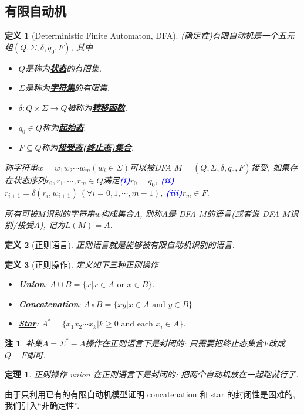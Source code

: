 \documentclass[8pt]{article}
\theoremstyle{compact}
\newtheorem{theorem}{定理}[section]
\newtheorem{definition}{定义}[section]
\newtheorem{remark}{注}[section]
\def\obj#1{\textbf{\uline{#1}}}
\def\num#1{\textnormal{\textbf{\mbox{\textcolor{blue}{(#1)}}}}}
\def\ge{\geqslant}
\begin{document}
\subsection{有限自动机}
\begin{definition}[Deterministic Finite Automaton, DFA]
	(确定性)有限自动机是一个五元组$(Q, \Sigma, \delta, q_0, F)$, 其中
	\begin{itemize}
		\item $Q$是称为\obj{状态}的有限集. 
		\item $\Sigma$是称为\obj{字符集}的有限集. 
		\item $\delta: Q \times \Sigma \to Q$被称为\obj{转移函数}. 
		\item $q_0 \in Q$称为\obj{起始态}. 
		\item $F \subseteq Q$称为\obj{接受态(终止态)集合}. 
	\end{itemize}

	称字符串$w = w_1w_2\cdots w_m(w_i \in \Sigma)$可以被DFA $M = (Q, \Sigma, \delta, q_0, F)$接受, 如果存在状态序列$r_0, r_1, \cdots, r_m \in Q$满足\num{i}$r_0 = q_0$, \num{ii}$r_{i+1} = \delta(r_i, w_{i+1}) \ (\forall i = 0, 1, \cdots, m-1)$, \num{iii}$r_m \in F$. 

	所有可被$M$识别的字符串$w$构成集合$A$, 则称$A$是 DFA $M$的语言(或者说 DFA $M$识别/接受$A$), 记为$L(M) = A$.
\end{definition}
\begin{definition}[正则语言]
	正则语言就是能够被有限自动机识别的语言. 
\end{definition}
\begin{definition}[正则操作]
	定义如下三种正则操作
	\begin{itemize}
		\item \obj{Union}: $A \cup B = \{x | x \in A \textrm{ or } x \in B\}$.
		\item \obj{Concatenation}: $A \circ B = \{xy | x \in A \textrm{ and } y \in B\}$.
		\item \obj{Star}: $A^* = \{x_1x_2\cdots x_k | k \ge 0 \textrm{ and each } x_i \in A\}$.
	\end{itemize}
\end{definition}
\begin{remark}
	补集$\overline{A} = \Sigma^* - A$操作在正则语言下是封闭的: 只需要把终止态集合$F$改成$Q - F$即可.
\end{remark}
\begin{theorem}
	正则操作 union 在正则语言下是封闭的: 把两个自动机放在一起跑就行了. 
\end{theorem}
由于只利用已有的有限自动机模型证明 concatenation 和 star 的封闭性是困难的, 我们引入“非确定性”. 
\end{document}
